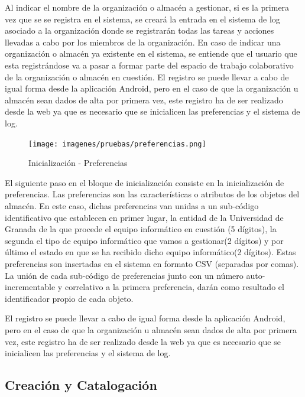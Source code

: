 \documentclass[a4paper,11pt]{book}
\begin{document}
Al indicar el nombre de la organización o almacén a gestionar, si es la primera vez que se se registra en el sistema, se creará la entrada en el sistema de log asociado  a la organización donde se registrarán todas las tareas y acciones llevadas a cabo por los miembros de la organización. En caso de indicar una organización o almacén ya existente en el sistema, se entiende que el usuario que esta registrándose va a pasar a formar parte del espacio de trabajo colaborativo de la organización o almacén en cuestión. El registro se puede llevar a cabo de igual forma desde la aplicación Android, pero en el caso de que la organización u almacén sean dados de alta por primera vez, este registro ha de ser realizado desde la web ya que es necesario que se inicialicen las preferencias y el sistema de log.

\begin{figure}[H] 
\centering 
\texttt{[image: imagenes/pruebas/preferencias.png]}
\caption{ Inicialización - Preferencias\cite{propio}}
\end{figure}

El siguiente paso en el bloque de inicialización consiste en la inicialización de preferencias. Las preferencias son las características o atributos de los objetos del almacén. En este caso, dichas preferencias van unidas a un sub-código identificativo que establecen en primer lugar, la entidad de la Universidad de Granada de la que procede el equipo informático en cuestión (5 dígitos), la segunda el tipo de equipo informático que vamos a gestionar(2 dígitos) y por último el estado en que se ha recibido dicho equipo informático(2 dígitos). Estas preferencias son insertadas en el sistema en formato CSV (separadas por comas). La unión de cada sub-código de preferencias junto con un número auto-incrementable y correlativo a  la primera preferencia, darán como resultado el identificador propio de cada objeto. 

El registro se puede llevar a cabo de igual forma desde la aplicación Android, pero en el caso de que la organización u almacén sean dados de alta por primera vez, este registro ha de ser realizado desde la web ya que es necesario que se inicialicen las preferencias y el sistema de log.


\subsection{Creación y Catalogación}
\end{document}
